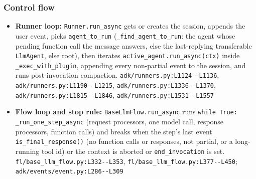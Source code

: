 \subsubsection*{Control flow}
\begin{itemize}
\item \textbf{Runner loop:} \texttt{Runner.\allowbreak{}run\_\allowbreak{}async} gets or creates the session, appends the user event, picks \texttt{agent\_\allowbreak{}to\_\allowbreak{}run} (\texttt{\_\allowbreak{}find\_\allowbreak{}agent\_\allowbreak{}to\_\allowbreak{}run}: the agent whose pending function call the message answers, else the last-replying transferable \texttt{LlmAgent}, else root), then iterates \texttt{active\_\allowbreak{}agent.\allowbreak{}run\_\allowbreak{}async(\allowbreak{}ctx)} inside \texttt{\_\allowbreak{}exec\_\allowbreak{}with\_\allowbreak{}plugin}, appending every non-partial event to the session, and runs post-invocation compaction. \texttt{adk/\allowbreak{}runners.\allowbreak{}py:\allowbreak{}L1124-\allowbreak{}-\allowbreak{}L1136}, \texttt{adk/\allowbreak{}runners.\allowbreak{}py:\allowbreak{}L1190-\allowbreak{}-\allowbreak{}L1215}, \texttt{adk/\allowbreak{}runners.\allowbreak{}py:\allowbreak{}L1336-\allowbreak{}-\allowbreak{}L1370}, \texttt{adk/\allowbreak{}runners.\allowbreak{}py:\allowbreak{}L1815-\allowbreak{}-\allowbreak{}L1846}, \texttt{adk/\allowbreak{}runners.\allowbreak{}py:\allowbreak{}L1531-\allowbreak{}-\allowbreak{}L1557}
\item \textbf{Flow loop and stop rule:} \texttt{BaseLlmFlow.\allowbreak{}run\_\allowbreak{}async} runs \texttt{while True:\allowbreak{} \_\allowbreak{}run\_\allowbreak{}one\_\allowbreak{}step\_\allowbreak{}async} (request processors, one model call, response processors, function calls) and breaks when the step's last event \texttt{is\_\allowbreak{}final\_\allowbreak{}response(\allowbreak{})} (no function calls or responses, not partial, or a long-running tool id) or the context is aborted or \texttt{end\_\allowbreak{}invocation} is set. \texttt{fl/\allowbreak{}base\_\allowbreak{}llm\_\allowbreak{}flow.\allowbreak{}py:\allowbreak{}L332-\allowbreak{}-\allowbreak{}L353}, \texttt{fl/\allowbreak{}base\_\allowbreak{}llm\_\allowbreak{}flow.\allowbreak{}py:\allowbreak{}L377-\allowbreak{}-\allowbreak{}L450}; \texttt{adk/\allowbreak{}events/\allowbreak{}event.\allowbreak{}py:\allowbreak{}L286-\allowbreak{}-\allowbreak{}L309}

\end{itemize}
